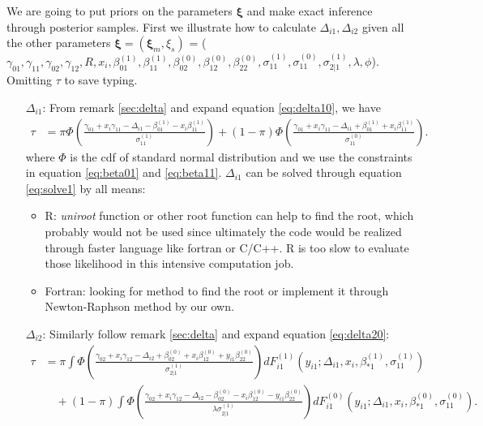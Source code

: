 \documentclass[12pt]{article}
\begin{document}
We are going to put priors on the parameters $\bm \xi$ and make exact
inference through posterior samples. First we illustrate how to
calculate $\Delta_{i1}, \Delta_{i2}$ given all the other parameters
$\bm \xi = (\bm \xi_m, \xi_s)$ = ($\gamma_{01}, \gamma_{11},
\gamma_{02}, \gamma_{12}, R, x_i, \beta_{01}^{(1)}, \beta_{11}^{(1)},
\beta_{02}^{(0)}, \beta_{12}^{(0)}, \beta_{22}^{(0)},
\sigma_{11}^{(1)}, \sigma_{11}^{(0)}, \sigma_{2|1}^{(1)}, \lambda,
\phi$). Omitting $\tau$ to save typing.

\begin{enumerate}
\item [$\Delta_{i1}$: ] From remark \ref{sec:delta} and expand
  equation \eqref{eq:delta10}, we have
  \begin{align}\label{eq:solve1}
    \tau & = \pi \Phi \left( \frac{\gamma_{01}+ x_i\gamma_{11} -
        \Delta_{i1} - \beta_{01}^{(1)} -
        x_i\beta_{11}^{(1)}}{\sigma_{11}^{(1)}} \right) + (1-\pi) \Phi
    \left( \frac{\gamma_{01} + x_i\gamma_{11} - \Delta_{i1} +
        \beta_{01}^{(1)} + x_i\beta_{11}^{(1)}}{\sigma_{11}^{(0)}}
    \right).
  \end{align}
  where $\Phi$ is the cdf of standard normal distribution and we use
  the constraints in equation \eqref{eq:beta01} and \eqref{eq:beta11}.
  $\Delta_{i1}$ can be solved through equation \eqref{eq:solve1} by
  all means:
  \begin{itemize}
  \item R: \textit{uniroot} function or other root function can help
    to find the root, which probably would not be used since
    ultimately the code would be realized through faster language like
    fortran or C/C++. R is too slow to evaluate those likelihood in
    this intensive computation job.
  \item Fortran: looking for method to find the root or implement it
    through Newton-Raphson method by our own.
  \end{itemize}
\item [$\Delta_{i2}$: ] Similarly follow remark \ref{sec:delta} and
  expand equation \eqref{eq:delta20}:
  \begin{align}
    \tau & = \pi \int \Phi \left( \frac{\gamma_{02} + x_i\gamma_{12} - \Delta_{i2} + \beta_{02}^{(0)} + x_i\beta_{12}^{(0)} + y_{i1}\beta_{22}^{(0)}}{\sigma_{2|1}^{(1)}} \right) dF_{i1}^{(1)}(y_{i1}; \Delta_{i1}, x_i, \beta_{*1}^{(1)}, \sigma_{11}^{(1)}) \\
    \label{eq:solve2}
    & \quad + (1-\pi) \int \Phi \left( \frac{\gamma_{02} + x_i\gamma_{12} - \Delta_{i2} - \beta_{02}^{(0)} - x_i\beta_{12}^{(0)} - y_{i1}\beta_{22}^{(0)}}{\lambda\sigma_{2|1}^{(1)}} \right) dF_{i1}^{(0)}(y_{i1}; \Delta_{i1}, x_i, \beta_{*1}^{(0)}, \sigma_{11}^{(0)}). \\

\end{align}
\end{enumerate}
\end{document}
